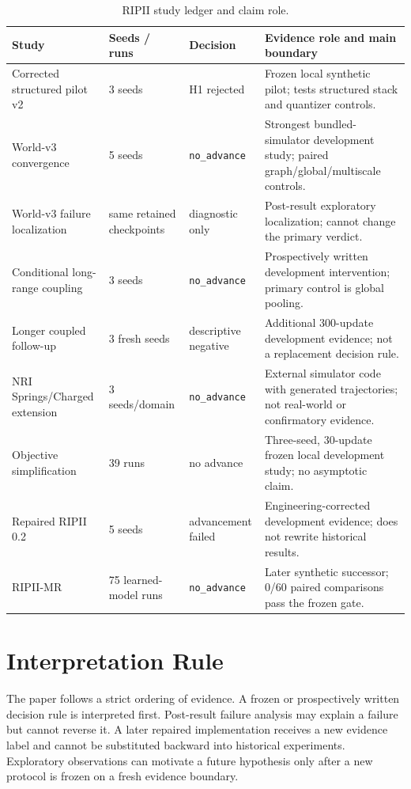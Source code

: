 \documentclass[10pt]{article}
\begin{document}
\begin{table}[h]
\centering
\small
\caption{RIPII study ledger and claim role.}
\label{tab:ledger}
\begin{tabularx}{\textwidth}{p{}p{}p{}X}
\toprule
Study & Seeds / runs & Decision & Evidence role and main boundary\\
\midrule
Corrected structured pilot v2 & 3 seeds & H1 rejected & Frozen local synthetic pilot; tests structured stack and quantizer controls.\\
World-v3 convergence & 5 seeds & \texttt{no\_advance} & Strongest bundled-simulator development study; paired graph/global/multiscale controls.\\
World-v3 failure localization & same retained checkpoints & diagnostic only & Post-result exploratory localization; cannot change the primary verdict.\\
Conditional long-range coupling & 3 seeds & \texttt{no\_advance} & Prospectively written development intervention; primary control is global pooling.\\
Longer coupled follow-up & 3 fresh seeds & descriptive negative & Additional 300-update development evidence; not a replacement decision rule.\\
NRI Springs/Charged extension & 3 seeds/domain & \texttt{no\_advance} & External simulator code with generated trajectories; not real-world or confirmatory evidence.\\
Objective simplification & 39 runs & no advance & Three-seed, 30-update frozen local development study; no asymptotic claim.\\
Repaired RIPII 0.2 & 5 seeds & advancement failed & Engineering-corrected development evidence; does not rewrite historical results.\\
RIPII-MR & 75 learned-model runs & \texttt{no\_advance} & Later synthetic successor; 0/60 paired comparisons pass the frozen gate.\\
\bottomrule
\end{tabularx}
\end{table}

\section{Interpretation Rule}

The paper follows a strict ordering of evidence. A frozen or prospectively written decision rule is interpreted first. Post-result failure analysis may explain a failure but cannot reverse it. A later repaired implementation receives a new evidence label and cannot be substituted backward into historical experiments. Exploratory observations can motivate a future hypothesis only after a new protocol is frozen on a fresh evidence boundary.



\end{document}
